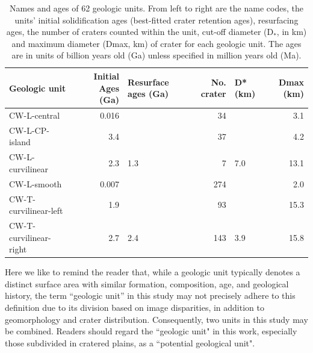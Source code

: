 \documentclass[preprint,12pt,3p,times,authoryear]{elsarticle}
\begin{document}
\begin{table}[t]%
\centering
\begin{tabular}{lrlrlr}
\hline
 Geologic unit          &   Initial Ages (Ga) & Resurface ages (Ga)   &   No. crater & D* (km)   &   Dmax (km) \\
\hline
 CW-L-central           &                              0.016 &                       &           34 &           &         3.1 \\
 CW-L-CP-island         &                              3.4   &                       &           37 &           &         4.2 \\
 CW-L-curvilinear       &                              2.3   & 1.3                   &            7 & 7.0       &        13.1 \\
 CW-L-smooth            &                              0.007 &                       &          274 &           &         2.0 \\
 CW-T-curvilinear-left  &                              1.9   &                       &           93 &           &        15.3 \\
 CW-T-curvilinear-right &                              2.7   & 2.4                   &          143 & 3.9       &        15.8 \\
\hline
\end{tabular}
  \caption{Names and ages of 62 geologic units. From left to right are the name codes, the units’ initial solidification ages (best-fitted crater retention ages), resurfacing ages, the number of craters counted within the unit, cut-off diameter (D$_{*}$, in  km) and maximum diameter (Dmax, km) of crater for each geologic unit. The ages are in units of billion years old (Ga) unless specified in million years old (Ma).}
\label{tab:cpf}
\end{table}
Here we like to remind the reader that, while a geologic unit typically denotes a distinct surface area with similar formation, composition, age, and geological history, the term ``geologic unit'' in this study may not precisely adhere to this definition due to its division based on image disparities, in addition to geomorphology and crater distribution. Consequently, two units in this study may be combined. Readers should regard the ``geologic unit" in this work, especially those subdivided in cratered plains, as a ``potential geological unit".

\end{document}

